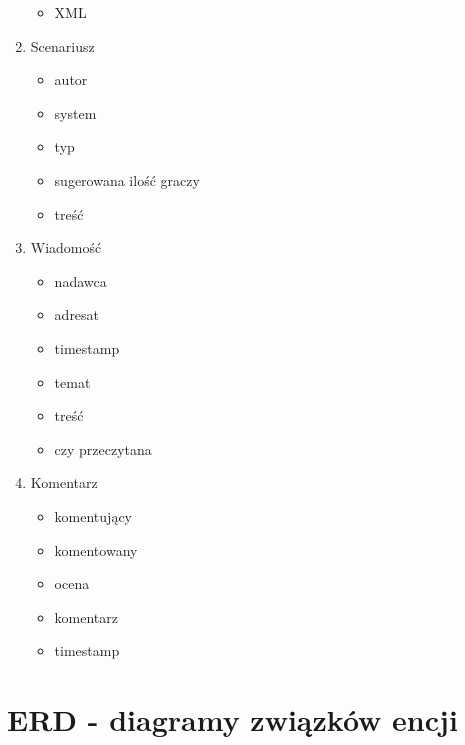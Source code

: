 \begin{enumerate}
\begin{itemize}
	\item XML
	\end{itemize}
\item Scenariusz
	\begin{itemize}
	\item autor
	\item system
	\item typ
	\item sugerowana ilość graczy
	\item treść
	\end{itemize}
\item Wiadomość
	\begin{itemize}
	\item nadawca
	\item adresat
	\item timestamp
	\item temat
	\item treść
	\item czy przeczytana
	\end{itemize}
\item Komentarz
	\begin{itemize}
	\item komentujący
	\item komentowany
	\item ocena
	\item komentarz
	\item timestamp
	\end{itemize}
\end{enumerate}


\clearpage
\section{ERD - diagramy związków encji}
\label{sec:ERD}

